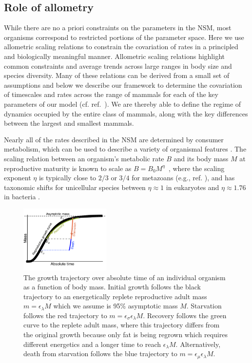 \documentclass[twocolumn,preprintnumbers,amsmath,amssymb,superscriptaddress]{revtex4}
\begin{document}
\begin{bibunit}[unsrt]
\section*{Role of allometry}
While there are no a priori constraints on the parameters in the NSM, most
organisms correspond to restricted portions of the parameter space.  Here we
use allometric scaling relations to constrain the covariation of rates in a
principled and biologically meaningful manner.  Allometric scaling relations
highlight common constraints and average trends across large ranges in body
size and species diversity. Many of these relations can be derived from a
small set of assumptions and below we describe our framework to determine the
covariation of timescales and rates across the range of mammals for each of
the key parameters of our model (cf. ref.~\cite{Yodzis:1992hg}).  We are thereby
able to define the regime of dynamics occupied by the entire class of mammals, along with the key differences between the largest and smallest mammals.


Nearly all of the rates described in the NSM are determined by consumer
metabolism, which can be used to describe a variety of organismal features
\cite{Brown:2004wq}.  The scaling relation between an organism's metabolic
rate $B$ and its body mass $M$ at reproductive maturity is known to scale as
$B = B_0 M^\eta$~\cite{West:2002it}, where the scaling exponent $\eta$ is
typically close to $2/3$ or $3/4$ for metazoans (e.g., ref. \cite{Brown:2004wq}),
and has taxonomic shifts for unicellular species between $\eta\approx 1$ in
eukaryotes and $\eta\approx 1.76$ in bacteria
\cite{DeLong:2010dy,Kempes:2012hy}.

\begin{figure}
\centering
\includegraphics[width=0.4\textwidth]{Growth-trajectory-diagram.pdf}
\caption{ The growth trajectory over absolute time of an individual organism
  as a function of body mass.  Initial growth follows the black trajectory to
  an energetically replete reproductive adult mass $m=\epsilon_\lambda M$ which we assume is 95\% asymptotic mass $M$.  Starvation follows the red
  trajectory to $m = \epsilon_\sigma \epsilon_\lambda  M$. Recovery follows the
  green curve to the replete adult mass, where this trajectory differs from the original growth because only fat is being regrown which requires different energetics and a longer time to reach $\epsilon_\lambda M$. Alternatively, death from starvation follows the blue trajectory to $m=\epsilon_\mu \epsilon_\lambda  M$.}
\label{fig:growth}
\end{figure}


\end{bibunit}
\end{document}
